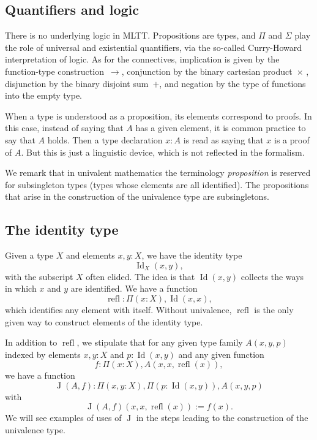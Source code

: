 \documentclass{article}
\newcommand{\Id}{\operatorname{Id}}
\newcommand{\J}{\operatorname{J}}
\newcommand{\refl}{\operatorname{refl}}
\begin{document}
\subsection{Quantifiers and logic}

There is no underlying logic in MLTT. Propositions are types, and
$\Pi$ and $\Sigma$ play the role of universal and existential
quantifiers, via the so-called Curry-Howard interpretation of
logic. As for the connectives, implication is given by the
function-type construction~$\to$, conjunction by the binary cartesian
product~$\times$ , disjunction by the binary disjoint sum~$+$, and
negation by the type of functions into the empty type.

When a type is understood as a proposition, its elements correspond to
proofs.  In this case, instead of saying that $A$ has a given element,
it is common practice to say that $A$ holds. Then a type declaration
$x:A$ is read as saying that $x$ is a proof of $A$. But this is just a
linguistic device, which is not reflected in the formalism.

We remark that in univalent mathematics the terminology
\emph{proposition} is reserved for subsingleton types (types whose
elements are all identified). The propositions that arise in the
construction of the univalence type are subsingletons.

\subsection{The identity type}

Given a type $X$ and elements $x,y:X$, we have the identity type
\[
    \Id_X(x,y),
\]
with the subscript $X$ often elided. The idea is that $\Id(x,y)$ collects
the ways in which $x$ and $y$ are identified.
%
We have a function
\[
    \refl : \Pi(x:X), \Id(x,x),
\]
which identifies any element with itself. Without univalence, $\refl$ is
the only given way to construct elements of the identity type.

In addition to $\refl$, we stipulate that for any given type family $A(x,y,p)$
indexed by elements $x,y:X$ and $p:\Id(x,y)$ and any given function
\[
    f : \Pi(x:X), A(x,x,\refl(x)),
\]
we have a function 
\[
    \J(A,f) : \Pi(x,y:X), \Pi(p:\Id(x,y)), A(x,y,p)
\]
with
\[
    \J(A,f)(x,x,\refl(x)) := f(x).
\]
We will see examples of uses of $\J$ in the steps leading to the
construction of the univalence type.
\end{document}
